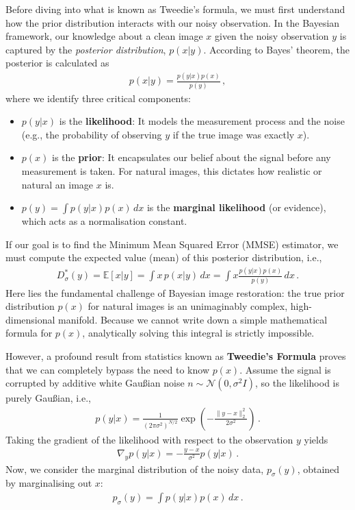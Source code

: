 Before diving into what is known as Tweedie's formula, we must first understand how the prior distribution interacts with our noisy observation. In the Bayesian framework, our knowledge about a clean image $x$ given the noisy observation $y$ is captured by the \emph{posterior distribution}, $p(x | y)$. According to Bayes' theorem, the posterior is calculated as
\begin{align}
    p(x | y) = \frac{p(y | x) p(x)}{p(y)} \, ,
    \label{eq:bayes}
\end{align}
where we identify three critical components:
\begin{itemize}
    \item $p(y | x)$ is the \textbf{likelihood}: It models the measurement process and the noise (e.g., the probability of observing $y$ if the true image was exactly $x$).
    \item $p(x)$ is the \textbf{prior}: It encapsulates our belief about the signal before any measurement is taken. For natural images, this dictates how realistic or natural an image $x$ is.
    \item $p(y) = \int p(y | x) p(x) \, dx$ is the \textbf{marginal likelihood} (or evidence), which acts as a normalisation constant.
\end{itemize}

If our goal is to find the Minimum Mean Squared Error (MMSE) estimator, we must compute the expected value (mean) of this posterior distribution, i.e.,
\begin{align*}
    D_\sigma^*(y) = \mathbb{E}[x | y] = \int x \, p(x | y) \, dx = \int x \frac{p(y | x) p(x)}{p(y)} \, dx \, .
\end{align*}
Here lies the fundamental challenge of Bayesian image restoration: the true prior distribution $p(x)$ for natural images is an unimaginably complex, high-dimensional manifold. Because we cannot write down a simple mathematical formula for $p(x)$, analytically solving this integral is strictly impossible.

However, a profound result from statistics known as \textbf{Tweedie's Formula} proves that we can completely bypass the need to know $p(x)$. Assume the signal is corrupted by additive white Gau\ss ian noise $n \sim \mathcal{N}(0, \sigma^2 I)$, so the likelihood is purely Gau\ss ian, i.e.,
\begin{align*}
    p(y | x) = \frac{1}{(2\pi\sigma^2)^{N/2}} \exp\left( - \frac{\|y - x\|_2^2}{2\sigma^2} \right) \, .
\end{align*}
Taking the gradient of the likelihood with respect to the observation $y$ yields
\begin{align}
    \nabla_y p(y | x) = -\frac{y - x}{\sigma^2} p(y | x) \, .
    \label{eq:tweedie_likelihood_grad}
\end{align}
Now, we consider the marginal distribution of the noisy data, $p_\sigma(y)$, obtained by marginalising out $x$:
\begin{align}
    p_\sigma(y) = \int p(y | x) p(x) \, dx \, .\label{eq:marginalised_noisy_data_distribution}
\end{align}

